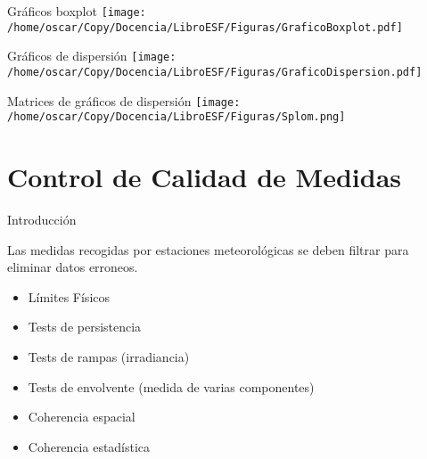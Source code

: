 \documentclass[xcolor={usenames,svgnames,dvipsnames}]{beamer}
\begin{document}
\begin{frame}[label=sec-2-3]{Gráficos boxplot}
\texttt{[image: /home/oscar/Copy/Docencia/LibroESF/Figuras/GraficoBoxplot.pdf]}
\end{frame}

\begin{frame}[label=sec-2-4]{Gráficos de dispersión}
\texttt{[image: /home/oscar/Copy/Docencia/LibroESF/Figuras/GraficoDispersion.pdf]}
\end{frame}

\begin{frame}[label=sec-2-5]{Matrices de gráficos de dispersión}
\texttt{[image: /home/oscar/Copy/Docencia/LibroESF/Figuras/Splom.png]}
\end{frame}
\section{Control de Calidad de Medidas}
\label{sec-3}

\begin{frame}[label=sec-3-1]{Introducción}
\begin{block}{Las medidas recogidas por estaciones meteorológicas se deben filtrar para eliminar datos erroneos.}
\begin{itemize}
\item Límites Físicos
\item Tests de persistencia
\item Tests de rampas (irradiancia)
\item Tests de envolvente (medida de varias componentes)
\item Coherencia espacial
\item Coherencia estadística
\end{itemize}
\end{block}
\end{frame}
\end{document}
